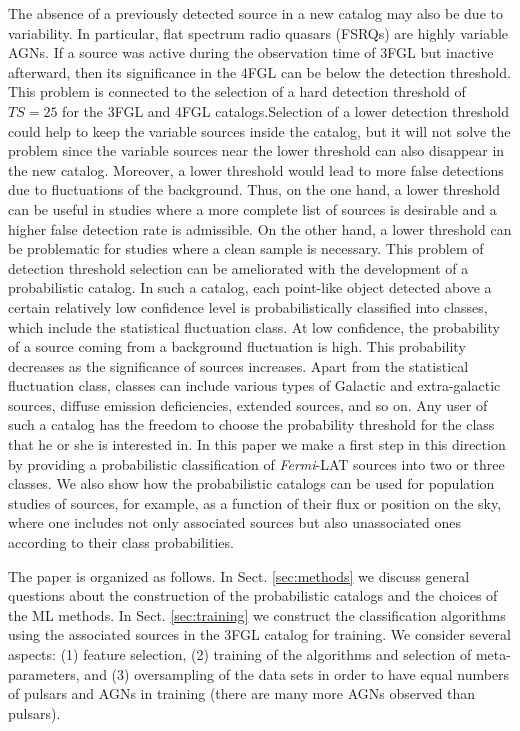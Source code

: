 \documentclass[referee]{aa} %
\newcommand{\Fermi}{\textit{Fermi}\xspace}
\begin{document}
The absence of a previously detected source in a new catalog may also be due to variability.
In particular, flat spectrum radio quasars (FSRQs) are highly variable AGNs.
If a source was active during the observation time of 3FGL but inactive afterward, 
then its significance in the 4FGL can be below the detection threshold.
This problem is connected to the selection of a hard detection threshold of $TS = 25$ for the 3FGL and 4FGL %
catalogs.Selection of a lower detection threshold could help to keep the variable sources inside the catalog, 
but it will not solve the problem since the variable sources near the lower threshold can also disappear in the new catalog.
Moreover, a lower threshold would lead to more false detections due to fluctuations of the background.
Thus, on the one hand, a lower threshold can be useful in studies where a more complete list of sources is desirable and a higher false detection rate is admissible.%
On the other hand, a lower threshold can be problematic for studies where 
a clean sample is necessary. 
This problem of detection threshold selection can be ameliorated with the development of a probabilistic catalog.
In such a catalog, each point-like object detected above a certain relatively low confidence level
is probabilistically classified into classes, which include the statistical fluctuation class.
At low confidence, the probability of a source coming from a background fluctuation is high.
This probability decreases as the significance of sources increases.
Apart from the statistical fluctuation class, classes can include various types of Galactic and extra-galactic sources, diffuse emission deficiencies, extended sources, and so on.
Any user of such a catalog has the freedom to choose the probability threshold for the class that he or she is interested in.
In this paper we make a first step in this direction by providing a probabilistic classification of \Fermi-LAT sources into two or three classes.
We also show how the probabilistic catalogs can be used for population studies of sources, for example,%
as a function of their flux or position on the sky, where one includes not only associated sources but also unassociated ones according to their class probabilities.

The paper is organized as follows.
In Sect. \ref{sec:methods} we discuss general questions about the construction of the probabilistic catalogs and the choices of the ML methods.
In Sect. \ref{sec:training} we construct the classification algorithms using the associated sources in the 3FGL catalog for training. We consider several aspects: (1) feature selection, (2) training of the algorithms and selection of meta-parameters,
and (3) oversampling of the data sets in order to have equal numbers of pulsars and AGNs in training (there are many more AGNs observed than pulsars).
\end{document}
